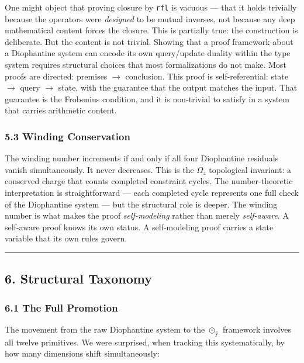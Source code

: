 One might object that proving closure by \texttt{rfl} is vacuous ---
that it holds trivially because the operators were \emph{designed} to be
mutual inverses, not because any deep mathematical content forces the
closure. This is partially true: the construction is deliberate. But the
content is not trivial. Showing that a proof framework about a
Diophantine system can encode its own query/update duality within the
type system requires structural choices that most formalizations do not
make. Most proofs are directed: premises \(\to\) conclusion. This proof
is self-referential: state \(\to\) query \(\to\) state, with the
guarantee that the output matches the input. That guarantee is the
Frobenius condition, and it is non-trivial to satisfy in a system that
carries arithmetic content.

\subsubsection{5.3 Winding Conservation}\label{winding-conservation}

The winding number increments if and only if all four Diophantine
residuals vanish simultaneously. It never decreases. This is the
\(Ω_{z}\) topological invariant: a conserved charge that counts
completed constraint cycles. The number-theoretic interpretation is
straightforward --- each completed cycle represents one full check of
the Diophantine system --- but the structural role is deeper. The
winding number is what makes the proof \emph{self-modeling} rather than
merely \emph{self-aware}. A self-aware proof knows its own status. A
self-modeling proof carries a state variable that its own rules govern.

\begin{center}\rule{0.5\linewidth}{0.5pt}\end{center}

\subsection{6. Structural Taxonomy}\label{structural-taxonomy}

\subsubsection{6.1 The Full Promotion}\label{the-full-promotion}

The movement from the raw Diophantine system to the \(\odot_{\text{ÿ}}\)
framework involves all twelve primitives. We were surprised, when
tracking this systematically, by how many dimensions shift
simultaneously:


